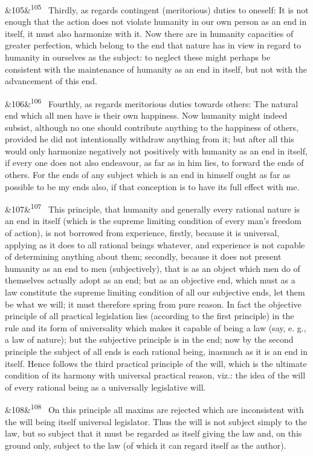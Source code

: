 \documentclass[12pt]{article}
\newcommand{\para}[1][]{\par\noindent\ifx&#1&\else\textsuperscript{\footnotesize #1}~\fi}
\begin{document}
\para[105] Thirdly, as regards contingent (meritorious) duties to oneself: It is not enough that the action does not violate humanity in our own person as an end in itself, it must also harmonize with it. Now there are in humanity capacities of greater perfection, which belong to the end that nature has in view in regard to humanity in ourselves as the subject: to neglect these might perhaps be consistent with the maintenance of humanity as an end in itself, but not with the advancement of this end.

\para[106] Fourthly, as regards meritorious duties towards others: The natural end which all men have is their own happiness. Now humanity might indeed subsist, although no one should contribute anything to the happiness of others, provided he did not intentionally withdraw anything from it; but after all this would only harmonize negatively not positively with humanity as an end in itself, if every one does not also endeavour, as far as in him lies, to forward the ends of others. For the ends of any subject which is an end in himself ought as far as possible to be my ends also, if that conception is to have its full effect with me.

\para[107] This principle, that humanity and generally every rational nature is an end in itself (which is the supreme limiting condition of every man's freedom of action), is not borrowed from experience, firstly, because it is universal, applying as it does to all rational beings whatever, and experience is not capable of determining anything about them; secondly, because it does not present humanity as an end to men (subjectively), that is as an object which men do of themselves actually adopt as an end; but as an objective end, which must as a law constitute the supreme limiting condition of all our subjective ends, let them be what we will; it must therefore spring from pure reason. In fact the objective principle of all practical legislation lies (according to the first principle) in the rule and its form of universality which makes it capable of being a law (say, e. g., a law of nature); but the subjective principle is in the end; now by the second principle the subject of all ends is each rational being, inasmuch as it is an end in itself. Hence follows the third practical principle of the will, which is the ultimate condition of its harmony with universal practical reason, viz.: the idea of the will of every rational being as a universally legislative will.

\para[108] On this principle all maxims are rejected which are inconsistent with the will being itself universal legislator. Thus the will is not subject simply to the law, but so subject that it must be regarded as itself giving the law and, on this ground only, subject to the law (of which it can regard itself as the author).
\end{document}
